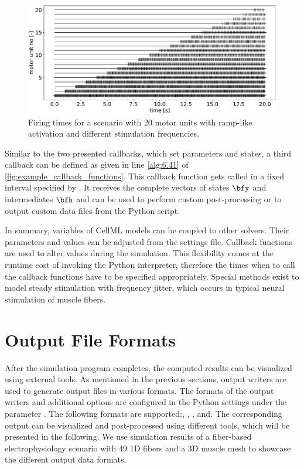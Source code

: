 \begin{figure}%
  \centering%
  \includegraphics[width=\textwidth]{images/implementation/firing_times_ramp1.pdf}%
  \caption{Firing times for a scenario with 20 motor units with ramp-like activation and different stimulation frequencies.}%
  \label{fig:firing_times_ramp}%
\end{figure}%

Similar to the two presented callbacks, which set parameters and states, a third callback  can be defined as given in line \ref{alg:6.41} of \cref{fig:example_callback_functions}. This callback function gets called in a fixed interval specified by . It receives the complete vectors of states $\bfy$ and intermediates $\bfh$ and can be used to perform custom post-processing or to output custom data files from the Python script.

In summary, variables of CellML models can be coupled to other solvers. Their parameters and values can be adjusted from the settings file. Callback functions are used to alter values during the simulation. This flexibility comes at the runtime cost of invoking the Python interpreter, therefore the times when to call the callback functions have to be specified appropriately. Special methods exist to model steady stimulation with frequency jitter, which occurs in typical neural stimulation of muscle fibers.

\section{Output File Formats}\label{sec:output_file_formats}

After the simulation program completes, the computed results can be visualized using external tools.
As mentioned in the previous sections, output writers are used to generate output files in various formats. The formats of the output writers and additional options are configured in the Python settings under the parameter . The following formats are supported:, , ,  and\break{}.
The corresponding output can be visualized and post-processed using different tools, which will be presented in the following. We use simulation results of a fiber-based electrophysiology scenario with 49 1D fibers and a 3D muscle mesh to showcase the different output data formats.


